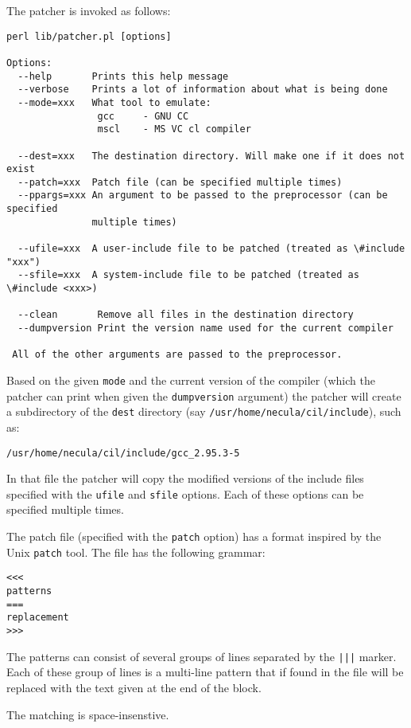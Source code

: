 \documentclass{book}
\def\t#1{{\tt #1}}
\begin{document}
 The patcher is invoked as follows: 
\begin{verbatim}
perl lib/patcher.pl [options]

Options:
  --help       Prints this help message
  --verbose    Prints a lot of information about what is being done
  --mode=xxx   What tool to emulate: 
                gcc     - GNU CC
                mscl    - MS VC cl compiler

  --dest=xxx   The destination directory. Will make one if it does not exist
  --patch=xxx  Patch file (can be specified multiple times)
  --ppargs=xxx An argument to be passed to the preprocessor (can be specified
               multiple times)

  --ufile=xxx  A user-include file to be patched (treated as \#include "xxx")
  --sfile=xxx  A system-include file to be patched (treated as \#include <xxx>)
 
  --clean       Remove all files in the destination directory
  --dumpversion Print the version name used for the current compiler

 All of the other arguments are passed to the preprocessor.
\end{verbatim}

 Based on the given \t{mode} and the current version of the compiler (which
the patcher can print when given the \t{dumpversion} argument) the patcher
will create a subdirectory of the \t{dest} directory (say \t{/usr/home/necula/cil/include}), such as:
\begin{verbatim}
/usr/home/necula/cil/include/gcc_2.95.3-5
\end{verbatim}

 In that file the patcher will copy the modified versions of the include files
specified with the \t{ufile} and \t{sfile} options. Each of these options can
be specified multiple times. 

 The patch file (specified with the \t{patch} option) has a format inspired by
the Unix \t{patch} tool. The file has the following grammar:

\begin{verbatim}
<<<
patterns
===
replacement
>>>
\end{verbatim}

 The patterns can consist of several groups of lines separated by the \t{|||}
marker. Each of these group of lines is a multi-line pattern that if found in
the file will be replaced with the text given at the end of the block. 

 The matching is space-insenstive.
\end{document}
